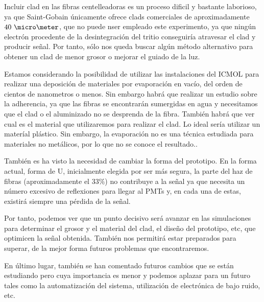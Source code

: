 Incluir clad en las fibras centelleadoras es un proceso dificil y bastante laborioso, ya que Saint-Gobain únicamente ofrece clads comerciales de aproximadamente $40~\micro\meter $, que no puede nser empleado este experimento, ya que ningún electrón procedente de la desintegración del tritio conseguiría atravesar el clad y producir señal. Por tanto, sólo nos queda buscar algún método alternativo para obtener un clad de menor grosor o mejorar el guiado de la luz. 

Estamos considerando la posibilidad de utilizar las instalaciones del ICMOL para realizar  una deposición de materiales por evaporación en vacío, del orden de cientos de nanometros o menos. Sin embargo habrá que realizar un estudio sobre la adherencia, ya que  las fibras se encontrarán sumergidas en agua  y necesitamos que el clad  o el aluminizado no se desprenda de  la fibra. También habrá que ver cual es el material que utilizaremos para realizar el clad. Lo ideal sería utilizar un materíal plástico. Sin embargo, la evaporación no es  una técnica estudiada para materiales no metálicos, por lo que no se conoce el resultado..

También es ha visto la necesidad de cambiar la forma del prototipo. En la forma actual, forma de U, inicialmente elegida por ser más segura,  la parte del haz de fibras (aproximadamente el $33\%$) no contribuye a la señal ya que necesita un número excesivo de reflexiones para llegar al PMTs y, en cada una de estas, existirá siempre una pérdida de la señal.

Por tanto,  podemos ver que un punto decisivo será avanzar en las simulaciones para determinar el grosor y el material del clad, el diseño del prototipo, etc, que optimicen la señal obtenida. También nos permitirá estar preparados para superar, de la mejor forma futuros problemas que  encontraremos.

En último lugar, también se han comentado futuros cambios que se están estudiando pero cuya importancia es menor y podemos aplazar para un futuro tales como la automatización del sistema, utilización de electrónica de bajo ruido, etc.